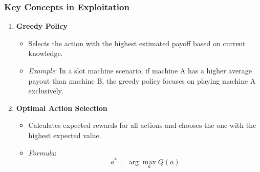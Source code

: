 \documentclass[aspectratio=169]{beamer}
\begin{document}
\begin{frame}[fragile]
    \frametitle{Key Concepts in Exploitation}
    \begin{enumerate}
        \item \textbf{Greedy Policy}
        \begin{itemize}
            \item Selects the action with the highest estimated payoff based on current knowledge.
            \item \textit{Example}: In a slot machine scenario, if machine A has a higher average payout than machine B, the greedy policy focuses on playing machine A exclusively.
        \end{itemize}
        
        \item \textbf{Optimal Action Selection}
        \begin{itemize}
            \item Calculates expected rewards for all actions and chooses the one with the highest expected value.
            \item \textit{Formula}:
            \begin{equation}
                a^* = \arg\max_a Q(a)
            \end{equation}
        \end{itemize}
    \end{enumerate}
\end{frame}
\end{document}
